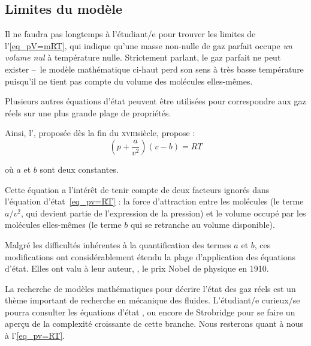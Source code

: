 	\subsection{Limites du modèle}

		Il ne faudra pas longtemps à l’étudiant/e pour trouver les limites de l’\cref{eq_pV=mRT}, qui indique qu’une masse non-nulle de gaz parfait occupe \textit{un volume nul} à température nulle. Strictement parlant, le gaz parfait ne peut exister --\ le modèle mathématique ci-haut perd son sens à très basse température puisqu’il ne tient pas compte du volume des molécules elles-mêmes.

		Plusieurs autres équations d’état peuvent être utilisées pour correspondre aux gaz réels sur une plus grande plage de propriétés.

		Ainsi, l’, proposée dès la fin du \textsc{xviii}\ieme siècle, propose :
		\begin{equation}
			\left(p + \frac{a}{v ^2}\right) (v - b) = R T
		\end{equation}
		
		\begin{equationterms}
			\item où $a$ et $b$ sont deux constantes.
		\end{equationterms}

		Cette équation a l’intérêt de tenir compte de deux facteurs ignorés dans l’équation d’état~\ref{eq_pv=RT} : la force d’attraction entre les molécules (le terme $a/v^2$, qui devient partie de l’expression de la pression) et le volume occupé par les molécules elles-mêmes (le terme $b$ qui se retranche au volume disponible).

		Malgré les difficultés inhérentes à la quantification des termes $a$ et  $b$, ces modifications ont considérablement étendu la plage d’application des équations d’état. Elles ont valu à leur auteur, , le prix Nobel de physique en 1910.

		La recherche de modèles mathématiques pour décrire l’état des gaz réels est un thème important de recherche en mécanique des fluides. L’étudiant/e curieux/se pourra consulter les équations d’état ,  ou encore de Strobridge pour se faire un aperçu de la complexité croissante de cette branche. Nous resterons quant à nous à l’\cref{eq_pv=RT}.



